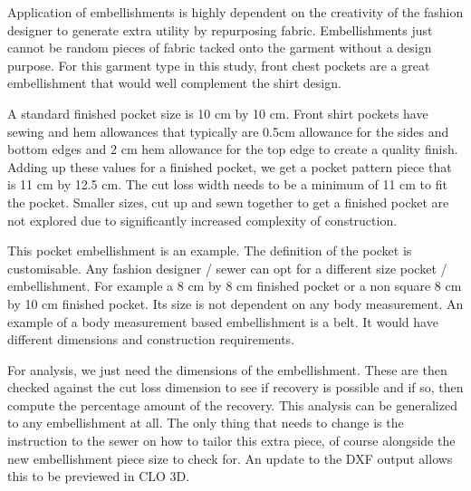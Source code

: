 Application of embellishments is highly dependent on the creativity of the fashion designer to generate extra utility by repurposing fabric. Embellishments just cannot be random pieces of fabric tacked onto the garment without a design purpose. For this garment type in this study, front chest pockets are a great embellishment that would well complement the shirt design. 

A standard finished pocket size is 10 cm by 10 cm. Front shirt pockets have sewing and hem allowances that typically are 0.5cm allowance for the sides and bottom edges and 2 cm hem allowance for the top edge to create a quality finish. Adding up these values for a finished pocket, we get a pocket pattern piece that is 11 cm by 12.5 cm. The cut loss width needs to be a minimum of 11 cm to fit the pocket. Smaller sizes, cut up and sewn together to get a finished pocket are not explored due to significantly increased complexity of construction.

This pocket embellishment is an example. The definition of the pocket is customisable. Any fashion designer / sewer can opt for a different size pocket / embellishment. For example a 8 cm by 8 cm finished pocket or a non square 8 cm by 10 cm finished pocket. Its size is not dependent on any body measurement. An example of a body measurement based embellishment is a belt. It would have different dimensions and construction requirements.

For analysis, we just need the dimensions of the embellishment. These are then checked against the cut loss dimension to see if recovery is possible and if so, then compute the percentage amount of the recovery. This analysis can be generalized to any embellishment at all. The only thing that needs to change is the instruction to the sewer on how to tailor this extra piece, of course alongside the new embellishment piece size to check for. An update to the DXF output allows this to be previewed in CLO 3D.



